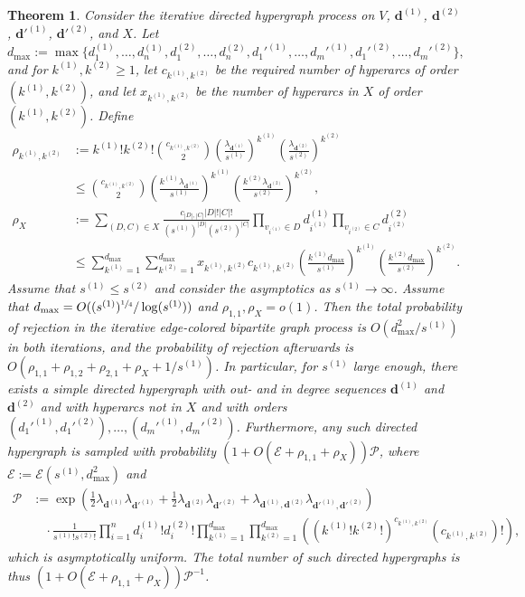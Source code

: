 \documentclass{article}
\theoremstyle{plain}
\newtheorem{theorem}{Theorem}[section]
\theoremstyle{remark}
\theoremstyle{plain}
\numberwithin{equation}{section}
\renewcommand{\d}{{\boldsymbol{d}}}
\begin{document}
	\begin{theorem}\label{theorem_dihy}
		Consider the iterative directed hypergraph process on $V$, $\d^{(1)}$, $\d^{(2)}$, $\d'^{(1)}$, $\d'^{(2)}$, and $X$. Let $$d_{\max}:=\max\{d_1^{(1)},\ldots,d_n^{(1)},d_1^{(2)},\ldots,d_n^{(2)},d_1'^{(1)},\ldots,d_m'^{(1)},d_1'^{(2)},\ldots,d_m'^{(2)}\},$$ and for $k^{(1)},k^{(2)}\geq1$, let $c_{k^{(1)},k^{(2)}}$ be the required number of hyperarcs of order $(k^{(1)},k^{(2)})$, and let $x_{k^{(1)},k^{(2)}}$ be the number of hyperarcs in $X$ of order $(k^{(1)},k^{(2)})$. Define
		\begin{align}
			\rho_{k^{(1)},k^{(2)}}&:=k^{(1)}!k^{(2)}!\binom{c_{k^{(1)},k^{(2)}}}{2}\left(\frac{\lambda_{\d^{(1)}}}{s^{(1)}}\right)^{k^{(1)}}\left(\frac{\lambda_{\d^{(2)}}}{s^{(2)}}\right)^{k^{(2)}}
			\\&\leq\binom{c_{k^{(1)},k^{(2)}}}{2}\left(\frac{k^{(1)}\lambda_{\d^{(1)}}}{s^{(1)}}\right)^{k^{(1)}}\left(\frac{k^{(2)}\lambda_{\d^{(2)}}}{s^{(2)}}\right)^{k^{(2)}},
			\\\rho_X&:=\sum_{(D,C)\in X}\frac{c_{|D|,|C|}|D|!|C|!}{(s^{(1)})^{|D|}(s^{(2)})^{|C|}}\prod_{v_{i^{(1)}}\in D}d_{i^{(1)}}^{(1)}\prod_{v_{i^{(2)}}\in C}d_{i^{(2)}}^{(2)}
			\\&\leq\sum_{k^{(1)}=1}^{d_{\max}}\sum_{k^{(2)}=1}^{d_{\max}}x_{k^{(1)},k^{(2)}}c_{k^{(1)},k^{(2)}}\left(\frac{k^{(1)}d_{\max}}{s^{(1)}}\right)^{k^{(1)}}\left(\frac{k^{(2)}d_{\max}}{s^{(2)}}\right)^{k^{(2)}}.
		\end{align}
		Assume that $s^{(1)}\leq s^{(2)}$ and consider the asymptotics as $s^{(1)}\to\infty$. Assume that $d_{\max}=O((s^{(1)})^{\sfrac14}/\log(s^{(1)}))$ and $\rho_{1,1},\rho_X=o(1)$. Then the total probability of rejection in the iterative edge-colored bipartite graph process is $O(d_{\max}^2/s^{(1)})$ in both iterations, and the probability of rejection afterwards is $O(\rho_{1,1}+\rho_{1,2}+\rho_{2,1}+\rho_X+1/s^{(1)})$. In particular, for $s^{(1)}$ large enough, there exists a simple directed hypergraph with out- and in degree sequences $\d^{(1)}$ and $\d^{(2)}$ and with hyperarcs not in $X$ and with orders $(d_1'^{(1)},d_1'^{(2)}),\ldots,(d_m'^{(1)},d_m'^{(2)})$. Furthermore, any such directed hypergraph is sampled with probability $(1+O(\mathscr{E}+\rho_{1,1}+\rho_X))\mathscr{P}$, where $\mathscr{E}:=\mathscr{E}(s^{(1)},d_{\max}^2)$ and
		\begin{align}
			\mathscr{P}&:=\exp\left(\tfrac12\lambda_{\d^{(1)}}\lambda_{\d'^{(1)}}+\tfrac12\lambda_{\d^{(2)}}\lambda_{\d'^{(2)}}+\lambda_{\d^{(1)},\d^{(2)}}\lambda_{\d'^{(1)},\d'^{(2)}}\right)
			\\&\quad\cdot\frac1{s^{(1)}!s^{(2)}!}\prod_{i=1}^{n}d_i^{(1)}!d_i^{(2)}!\prod_{k^{(1)}=1}^{d_{\max}}\prod_{k^{(2)}=1}^{d_{\max}}((k^{(1)}!k^{(2)}!)^{c_{k^{(1)},k^{(2)}}}(c_{k^{(1)},k^{(2)}})!),
		\end{align}
		which is asymptotically uniform. The total number of such directed hypergraphs is thus $(1+O(\mathscr{E}+\rho_{1,1}+\rho_X))\mathscr{P}^{-1}$.
	\end{theorem}
	
\end{document}
